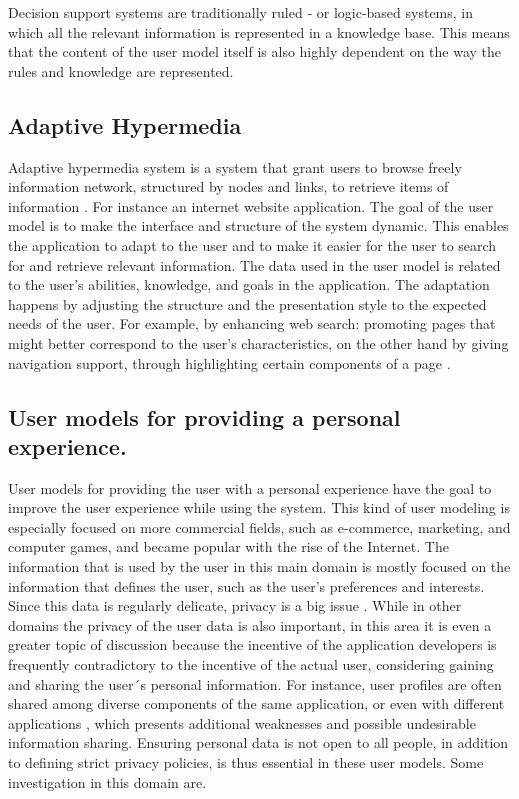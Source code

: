 Decision support systems are traditionally ruled ‐ or logic-based systems, in
which all the relevant information is represented in a knowledge base. This
means that the content of the user model itself is also highly dependent on the
way the rules and knowledge are represented.


\subsection{Adaptive Hypermedia}

Adaptive hypermedia system is a system that grant users to browse freely
information network,  structured by nodes and links, to retrieve items of
information \cite{deepa2012adaptive}. For instance an internet website
application. The goal of the user model is to make the interface and structure
of the system dynamic. This enables the application to adapt to the user and to
make it easier for the user to search for and retrieve relevant information.
The data used in the user model is related to the user’s abilities, knowledge,
and goals in the application. The adaptation happens by adjusting the structure
and the presentation style to the expected needs of the user. For example, by
enhancing web search: promoting pages that might better correspond to the user’s
characteristics, on the other hand by giving navigation support, through
highlighting certain components of a page \cite{razmerita2012user}.

\subsection{User models for providing a personal experience.}

User models for providing the user with a personal experience have the goal to
improve the user experience while using the system.  This kind of user modeling
is especially focused on more commercial fields, such as e-commerce, marketing,
and computer games, and became popular with the rise of the Internet.  The
information that is used by the user in this main domain is mostly focused on
the information that defines the user, such as the user’s preferences and
interests. Since this data is regularly delicate, privacy is a  big issue
\cite{toch2012personalization}. While in other domains the privacy of the user
data is also important, in this area it is even a greater topic of discussion
because the incentive of the application developers is frequently contradictory
to the incentive of the actual user, considering gaining and sharing the user´s
personal information. For instance, user profiles are often shared among diverse
components of the same application, or even with different applications
\cite{brun2010compass} \cite{karam2012modeling}, which presents additional
weaknesses and possible undesirable information sharing.  Ensuring personal data
is not open to all people, in addition to defining strict privacy policies, is
thus essential in these user models. Some investigation in this domain are.

